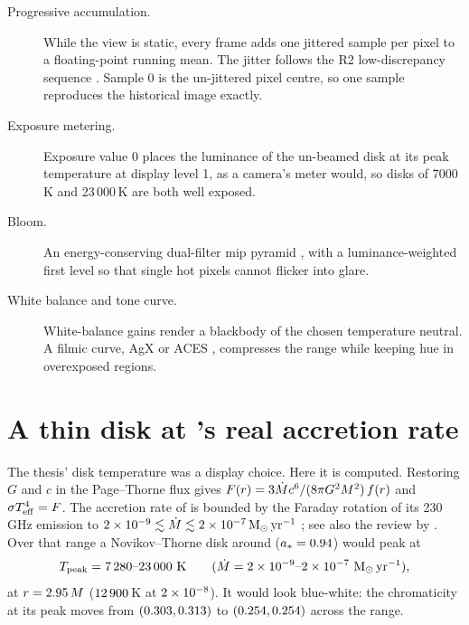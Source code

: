 \begin{description}
\item[Progressive accumulation.] While the view is static, every frame adds
one jittered sample per pixel to a floating-point running mean. The jitter
follows the R2 low-discrepancy sequence \citep{Roberts2018}. Sample 0 is the
un-jittered pixel centre, so one sample reproduces the historical image
exactly.
\item[Exposure metering.] Exposure value 0 places the luminance of the
un-beamed disk at its peak temperature at display level 1, as a camera's
meter would, so disks of 7000\,K and 23\,000\,K are both well exposed.
\item[Bloom.] An energy-conserving dual-filter mip pyramid
\citep{Jimenez2014}, with a luminance-weighted first level so that single
hot pixels cannot flicker into glare.
\item[White balance and tone curve.] White-balance gains render a blackbody
of the chosen temperature neutral. A filmic curve, AgX \citep[][via the
polynomial fit of \citealt{Wrensch2023}]{Sobotka2022} or ACES
\citep{Narkowicz2016}, compresses the range while keeping hue in
overexposed regions.
\end{description}

\section{A thin disk at \sgra's real accretion rate}
\label{sec:thindisk}

The thesis' disk temperature was a display choice. Here it is computed.
Restoring $G$ and $c$ in the Page--Thorne flux \citep{PageThorne1974} gives
$F(r) = 3\dot M c^6/(8\pi G^2M^2)\,f(r)$ and $\sigma T_{\rm eff}^4 = F$. The
accretion rate of \sgra{} is bounded by the Faraday rotation of its 230\,GHz
emission to $2\times10^{-9} \lesssim \dot M \lesssim 2\times10^{-7}\,\mathrm{M}_\odot\,{\rm yr}^{-1}$
\citep{Marrone2007}; see also the review by \citet{Genzel2010}. Over that
range a Novikov--Thorne disk around \sgra{} ($a_* = 0.94$) would peak at
\begin{equation}
T_{\rm peak} = 7\,280\text{--}23\,000\ {\rm K}
\qquad (\dot M = 2\times10^{-9}\text{--}2\times10^{-7}\ \mathrm{M}_\odot\,{\rm yr}^{-1}),
\end{equation}
at $r = 2.95\,M$ ($12\,900$\,K at $2\times10^{-8}$). It would look
blue-white: the chromaticity at its peak moves from $(0.303,
0.313)$ to $(0.254, 0.254)$ across the range.

